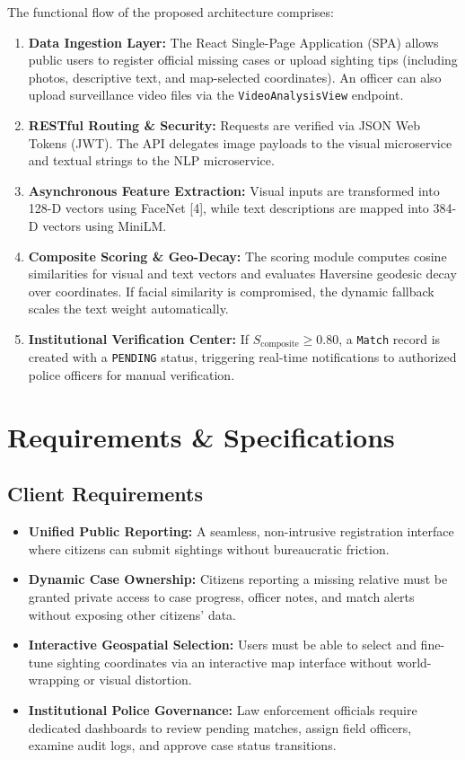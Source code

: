 \documentclass[12pt,a4paper]{report}
\begin{document}
The functional flow of the proposed architecture comprises:
\begin{enumerate}
    \item \textbf{Data Ingestion Layer:} The React Single-Page Application (SPA) allows public users to register official missing cases or upload sighting tips (including photos, descriptive text, and map-selected coordinates). An officer can also upload surveillance video files via the \texttt{VideoAnalysisView} endpoint.
    \item \textbf{RESTful Routing \& Security:} Requests are verified via JSON Web Tokens (JWT). The API delegates image payloads to the visual microservice and textual strings to the NLP microservice.
    \item \textbf{Asynchronous Feature Extraction:} Visual inputs are transformed into 128-D vectors using FaceNet [4], while text descriptions are mapped into 384-D vectors using MiniLM.
    \item \textbf{Composite Scoring \& Geo-Decay:} The scoring module computes cosine similarities for visual and text vectors and evaluates Haversine geodesic decay over coordinates. If facial similarity is compromised, the dynamic fallback scales the text weight automatically.
    \item \textbf{Institutional Verification Center:} If $S_{\text{composite}} \ge 0.80$, a \texttt{Match} record is created with a \texttt{PENDING} status, triggering real-time notifications to authorized police officers for manual verification.
\end{enumerate}

\section{Requirements \& Specifications}

\subsection{Client Requirements}
\begin{itemize}
    \item \textbf{Unified Public Reporting:} A seamless, non-intrusive registration interface where citizens can submit sightings without bureaucratic friction.
    \item \textbf{Dynamic Case Ownership:} Citizens reporting a missing relative must be granted private access to case progress, officer notes, and match alerts without exposing other citizens' data.
    \item \textbf{Interactive Geospatial Selection:} Users must be able to select and fine-tune sighting coordinates via an interactive map interface without world-wrapping or visual distortion.
    \item \textbf{Institutional Police Governance:} Law enforcement officials require dedicated dashboards to review pending matches, assign field officers, examine audit logs, and approve case status transitions.
\end{itemize}
\end{document}
